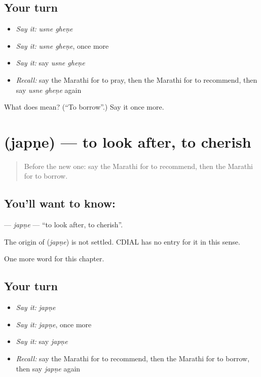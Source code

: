 \subsection*{Your turn}
\begin{itemize}
\raggedright
  \item \emph{Say it:} \emph{usne gheṇe}
  \item \emph{Say it:} \emph{usne gheṇe}, once more
  \item \emph{Say it:} say \emph{usne gheṇe}
  \item \emph{Recall:} say the Marathi for to pray, then the Marathi for to recommend, then say \emph{usne gheṇe} again
\end{itemize}

\begin{tcolorbox}[breakable,colback=teal!4,colframe=teal!35!black,title={Before you move on}]
What does   mean? (\textquotedblleft{}To borrow\textquotedblright{}.) Say it once more.
\end{tcolorbox}
\section[\texorpdfstring{\mr{जपणे} (japṇe)}{जपणे (japṇe)}]{ (japṇe) — to look after, to cherish}

\label{lesson:MR-C256-japne}



\begin{quote}
Before the new one: say the Marathi for to recommend, then the Marathi for to borrow.
\end{quote}

\subsection*{You'll want to know: }
\textbf{} — \emph{japṇe} — \textquotedblleft{}to look after, to cherish\textquotedblright{}.

\begin{cousinweb}
The origin of \textbf{} (\emph{japṇe}) is not settled. CDIAL has no entry for it in this sense.
\end{cousinweb}

\begin{grammarlens}[title={What you've built}]
One more word for this chapter.
\end{grammarlens}

\subsection*{Your turn}
\begin{itemize}
\raggedright
  \item \emph{Say it:} \emph{japṇe}
  \item \emph{Say it:} \emph{japṇe}, once more
  \item \emph{Say it:} say \emph{japṇe}
  \item \emph{Recall:} say the Marathi for to recommend, then the Marathi for to borrow, then say \emph{japṇe} again
\end{itemize}


